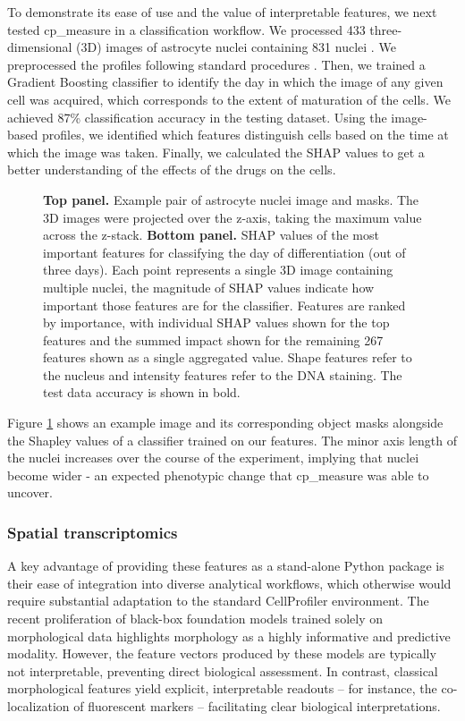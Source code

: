 \documentclass{article}
\begin{document}
To demonstrate its ease of use and the value of interpretable features, we next tested cp\_measure in a classification workflow. We processed 433 three-dimensional (3D) images of astrocyte nuclei containing 831 nuclei \citep{kalinin3DCellNuclear2018}. We preprocessed the profiles following standard procedures \citep{caicedoDataanalysisStrategiesImagebased2017}. Then, we trained a Gradient Boosting classifier to identify the day in which the image of any given cell was acquired, which corresponds to the extent of maturation of the cells. We achieved 87\% classification accuracy in the testing dataset. Using the image-based profiles, we identified which features distinguish cells based on the time at which the image was taken. Finally, we calculated the SHAP values \citep{sundararajanManyShapleyValues2020} to get a better understanding of the effects of the drugs on the cells.

\begin{figure}[htbp]
\centering

\caption{\label{fig:astrocytes}\textbf{Top panel.} Example pair of astrocyte nuclei image and masks. The 3D images were projected over the z-axis, taking the maximum value across the z-stack. \textbf{Bottom panel.} SHAP values of the most important features for classifying the day of differentiation (out of three days). Each point represents a single 3D image containing multiple nuclei, the magnitude of SHAP values indicate how important those features are for the classifier. Features are ranked by importance, with individual SHAP values shown for the top features and the summed impact shown for the remaining 267 features shown as a single aggregated value. Shape features refer to the nucleus and intensity features refer to the DNA staining. The test data accuracy is shown in bold.}
\end{figure}

Figure \ref{fig:astrocytes} shows an example image and its corresponding object masks alongside the Shapley values of a classifier trained on our features. The minor axis length of the nuclei increases over the course of the experiment, implying that nuclei become wider - an expected phenotypic change that cp\_measure was able to uncover.
\subsubsection{Spatial transcriptomics}
\label{sec:org5711d86}
A key advantage of providing these features as a stand-alone Python package is their ease of integration into diverse analytical workflows, which otherwise would require substantial adaptation to the standard CellProfiler environment. The recent proliferation of black-box foundation models trained solely on morphological data highlights morphology as a highly informative and predictive modality. However, the feature vectors produced by these models are typically not interpretable, preventing direct biological assessment. In contrast, classical morphological features yield explicit, interpretable readouts -- for instance, the co-localization of fluorescent markers -- facilitating clear biological interpretations.
\end{document}

